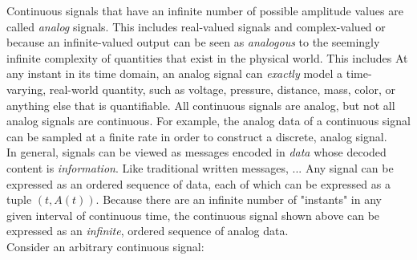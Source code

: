 Continuous signals that have an infinite number of possible amplitude values are called \textit{analog} signals. This includes real-valued signals and complex-valued or  because an infinite-valued output can be seen as \textit{analogous} to the seemingly infinite complexity of quantities that exist in the physical world. This includes At any instant in its time domain, an analog signal can \textit{exactly} model a time-varying, real-world quantity, such as voltage, pressure, distance, mass, color, or anything else that is quantifiable. All continuous signals are analog, but not all analog signals are continuous. For example, the analog data of a continuous signal can be sampled at a finite rate in order to construct a discrete, analog signal. \\


In general, signals can be viewed as messages encoded in \textit{data} whose decoded content is \textit{information}. Like traditional written messages, ... Any signal can be expressed as an ordered sequence of data, each of which can be expressed as a tuple $(t,A(t))$. Because there are an infinite number of "instants" in any given interval of continuous time, the continuous signal shown above can be expressed as an \textit{infinite}, ordered sequence of analog data. \\


Consider an arbitrary continuous signal:

\begin{center}
\end{center}

